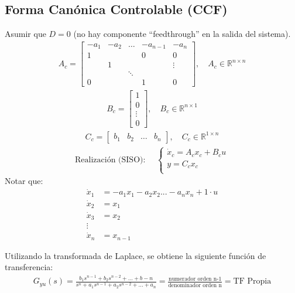\subsection{Forma Canónica Controlable (CCF)}
Asumir que ${D}={0}$ (no hay componente ``feedthrough'' en la salida del sistema).
\begin{align*}
{A_c}=\left[
    \begin{array}{cccc|c}
     -a_1 & -a_2 & \dots & -a_{n-1} & -a_n\\ \hline
     1 & & & 0 & 0\\
       & 1 & & & \vdots\\
       & & \ddots & & \\
     0 & & & 1 & 0  
    \end{array}\right], \quad {A_c}\in \mathbb{R}^{n\times n}
\end{align*}
\begin{align*}
{B_c}=\left[
    \begin{array}{c}
     1 \\ \hline
     0\\
    \vdots\\
     0  
    \end{array}\right], \quad {B_c}\in \mathbb{R}^{n\times 1}
\end{align*}
\begin{align*}
{C_c}=\left[
    \begin{array}{cccc}
     b_1 & b_2 & \dots & b_n
    \end{array}\right], \quad {C_c}\in \mathbb{R}^{1\times n}
\end{align*}
\begin{align*}
    \text{Realización (SISO): }\quad 
    \left\{
    \begin{array}{l}
          {\dot{x}_c}={A_c}{x_c}+{B_c}u \\
          y={C_c}{x_c} \\
    \end{array} 
    \right. 
\end{align*}
Notar que:
\begin{align*}
    \dot{x}_1 &= -a_1x_1-a_2x_2 ... -a_nx_n+1\cdot u\\
    \dot{x}_2 &= x_1\\
    \dot{x}_3 &= x_2\\
    \vdots \\
    \dot{x}_n &= x_{n-1}
\end{align*}

Utilizando la transformada de Laplace, se obtiene la siguiente función de transferencia:
\begin{align*}
    G_{yu}(s)=\frac{b_1s^{n-1}+b_2s^{n-2}+...+b-n}{s^n+a_1s^{n-1}+a_2s^{n-2}+...+a_n} = \frac{\text{numerador orden n-1}}{\text{denominador orden n}} = \text{TF Propia}
\end{align*}

